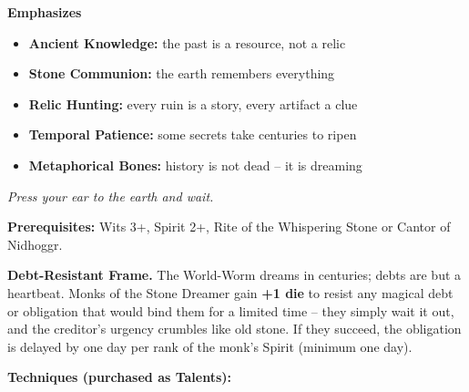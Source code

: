\noindent\textbf{Emphasizes}
\begin{itemize}
  \item \textbf{Ancient Knowledge:} the past is a resource, not a relic
  \item \textbf{Stone Communion:} the earth remembers everything
  \item \textbf{Relic Hunting:} every ruin is a story, every artifact a clue
  \item \textbf{Temporal Patience:} some secrets take centuries to ripen
  \item \textbf{Metaphorical Bones:} history is not dead -- it is dreaming
\end{itemize}

\begin{tcolorbox}[colback=black!5,colframe=green!70!black,title=\textbf{Stone Dreamer (Nidhoggr)},breakable]
  \emph{Press your ear to the earth and wait.}

  \vspace{2mm}
  \noindent\textbf{Prerequisites:} Wits 3+, Spirit 2+, Rite of the Whispering Stone or Cantor of Nidhoggr.

  \vspace{2mm}
  \noindent\textbf{Debt-Resistant Frame.} The World-Worm dreams in centuries; debts are but a heartbeat. Monks of the Stone Dreamer gain \textbf{+1 die} to resist any magical debt or obligation that would bind them for a limited time -- they simply wait it out, and the creditor's urgency crumbles like old stone. If they succeed, the obligation is delayed by one day per rank of the monk's Spirit (minimum one day).

  \vspace{2mm}
  \noindent\textbf{Techniques (purchased as Talents):}


\end{tcolorbox}

